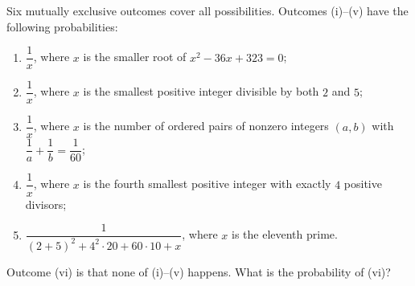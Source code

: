 Six mutually exclusive outcomes cover all possibilities. Outcomes (i)--(v) have the following probabilities:
\begin{enumerate}
\item[(i)] $\dfrac1x$, where $x$ is the smaller root of $x^2-36x+323=0$;
\item[(ii)] $\dfrac1x$, where $x$ is the smallest positive integer divisible by both $2$ and $5$;
\item[(iii)] $\dfrac1x$, where $x$ is the number of ordered pairs of nonzero integers $(a,b)$ with $\dfrac1a+\dfrac1b=\dfrac1{60}$;
\item[(iv)] $\dfrac1x$, where $x$ is the fourth smallest positive integer with exactly $4$ positive divisors;
\item[(v)] $\dfrac{1}{(2+5)^2+4^2\cdot20+60\cdot10+x}$, where $x$ is the eleventh prime.
\end{enumerate}
Outcome (vi) is that none of (i)--(v) happens. What is the probability of (vi)?
